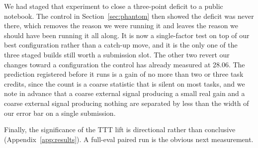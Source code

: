 \documentclass[11pt]{article}
\begin{document}
We had staged that experiment to close a three-point deficit to a public notebook. The control in
Section~\ref{sec:phantom} then showed the deficit was never there, which removes the reason we were
running it and leaves the reason we should have been running it all along. It is now a single-factor test
on top of our best configuration rather than a catch-up move, and it is the only one of the three staged
builds still worth a submission slot. The other two revert our changes toward a configuration the control
has already measured at 28.06. The prediction registered before it runs is a gain of no more than two or
three task credits, since the count is a coarse statistic that is silent on most tasks, and we note in
advance that a coarse external signal producing a small real gain and a coarse external signal producing
nothing are separated by less than the width of our error bar on a single submission.

Finally, the significance of the TTT lift is directional
rather than conclusive (Appendix~\ref{app:results}). A full-eval paired run is the obvious next
measurement.
\end{document}
